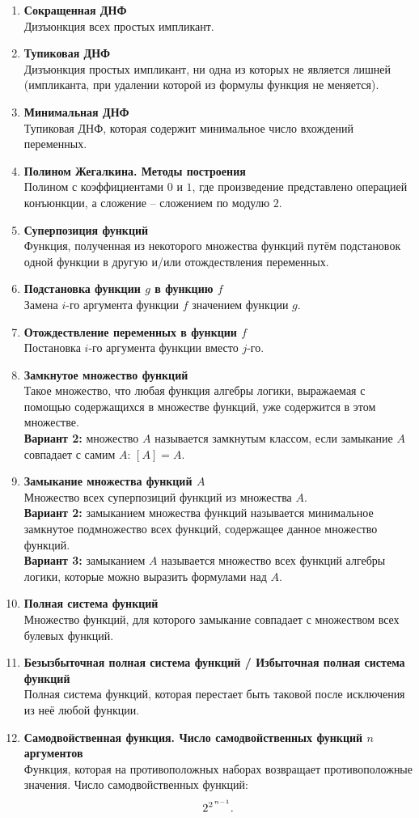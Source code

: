 \documentclass[a4paper,12pt,oneside]{article}
\newcommand{\BigDisp}[1]{%
\[
{\Large\displaystyle #1}
\]
}
\newcommand{\DefItem}[2]{\item \textbf{#1}\\#2}
\begin{document}
\begin{enumerate}[label=\arabic*.]
\DefItem{Сокращенная ДНФ}{Дизъюнкция всех простых импликант.}

\DefItem{Тупиковая ДНФ}{Дизъюнкция простых импликант, ни одна из которых не является лишней (импликанта, при удалении которой из формулы функция не меняется).}

\DefItem{Минимальная ДНФ}{Тупиковая ДНФ, которая содержит минимальное число вхождений переменных.}

\DefItem{Полином Жегалкина. Методы построения}{Полином с коэффициентами $0$ и $1$, где произведение представлено операцией конъюнкции, а сложение – сложением по модулю $2$.}

\DefItem{Суперпозиция функций}{Функция, полученная из некоторого множества функций путём подстановок одной функции в другую и/или отождествления переменных.}

\DefItem{Подстановка функции $g$ в функцию $f$}{Замена $i$-го аргумента функции $f$ значением функции $g$.}

\DefItem{Отождествление переменных в функции $f$}{Постановка $i$-го аргумента функции вместо $j$-го.}

\DefItem{Замкнутое множество функций}{Такое множество, что любая функция алгебры логики, выражаемая с помощью содержащихся в множестве функций, уже содержится в этом множестве.\\
\textbf{Вариант 2:} множество $A$ называется замкнутым классом, если замыкание $A$ совпадает с самим $A$: $[A]=A$.}

\DefItem{Замыкание множества функций $A$}{Множество всех суперпозиций функций из множества $A$.\\
\textbf{Вариант 2:} замыканием множества функций называется минимальное замкнутое подмножество всех функций, содержащее данное множество функций.\\
\textbf{Вариант 3:} замыканием $A$ называется множество всех функций алгебры логики, которые можно выразить формулами над $A$.}

\DefItem{Полная система функций}{Множество функций, для которого замыкание совпадает с множеством всех булевых функций.}

\DefItem{Безызбыточная полная система функций / Избыточная полная система функций}{Полная система функций, которая перестает быть таковой после исключения из неё любой функции.}

\DefItem{Самодвойственная функция. Число самодвойственных функций $n$ аргументов}{Функция, которая на противоположных наборах возвращает противоположные значения. Число самодвойственных функций:
\BigDisp{2^{2^{\,n-1}}.}}


\end{enumerate}
\end{document}
